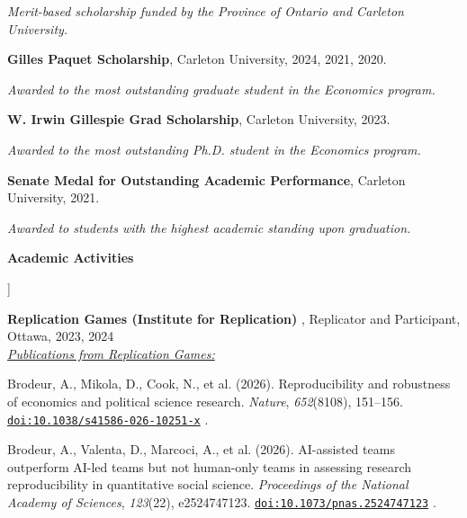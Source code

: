 \documentclass[11pt]{article}
\newcommand{\cvlabel}[1]{%
    \raisebox{0pt}[0pt][0pt]{%
        \parbox[t]{1.38in}{%
            \raggedright
            \bfseries
            #1
        }%
    }%
}
\newcommand{\smallgap}{%
    \vspace{0.45em}
}
\newcommand{\awarddesc}[1]{%
    \par
    \hspace{0.5em}
    \textit{#1}
}
\newcommand{\doi}[1]{%
    \href{https://doi.org/#1}{\nolinkurl{doi:#1}}%
}
\begin{document}
\begin{cvsections}
\awarddesc{
Merit-based scholarship funded by the Province of Ontario
and Carleton University.
}

\smallgap

\textbf{Gilles Paquet Scholarship},
Carleton University,
2024,
2021,
2020.

\awarddesc{
Awarded to the most outstanding graduate student
in the Economics program.
}

\smallgap

\textbf{W. Irwin Gillespie Grad Scholarship},
Carleton University,
2023.

\awarddesc{
Awarded to the most outstanding Ph.D. student
in the Economics program.
}

\smallgap

\textbf{Senate Medal for Outstanding Academic Performance},
Carleton University,
2021.

\awarddesc{
Awarded to students with the highest academic standing
upon graduation.
}


\item[\cvlabel{Academic Activities}]

\textbf{
Replication Games (Institute for Replication)
},
Replicator and Participant,
Ottawa,
2023,
2024
\\

\hspace*{1.15em}
\underline{\textit{
Publications from Replication Games:
}}

\begin{cvitems}

\item
Brodeur, A.,
Mikola, D.,
Cook, N.,
et al. (2026).
Reproducibility and robustness of economics and political science research.
\textit{Nature},
\textit{652}(8108),
151--156.
\doi{10.1038/s41586-026-10251-x}.


\item
Brodeur, A.,
Valenta, D.,
Marcoci, A.,
et al. (2026).
AI-assisted teams outperform AI-led teams but not human-only teams
in assessing research reproducibility in quantitative social science.
\textit{Proceedings of the National Academy of Sciences},
\textit{123}(22),
e2524747123.
\doi{10.1073/pnas.2524747123}.


\end{cvitems}



\end{cvsections}
\end{document}
